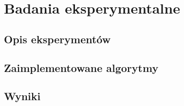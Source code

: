 \chapter{Badania eksperymentalne}
\section{Opis eksperymentów}
\section{Zaimplementowane algorytmy}
\section{Wyniki}